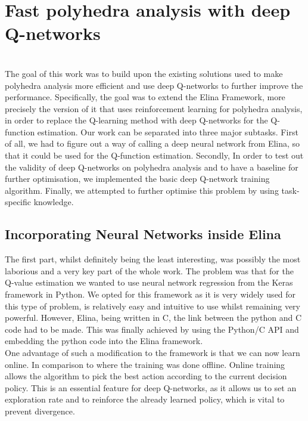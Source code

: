 
\chapter{Fast polyhedra analysis with deep Q-networks}
\mbox{}\\
The goal of this work was to build upon the existing solutions used to make polyhedra analysis more efficient and use deep Q-networks to further improve the performance. Specifically, the goal was to extend the Elina Framework, more precisely the version of it that uses reinforcement learning for polyhedra analysis, in order to replace the Q-learning method with deep Q-networks for the Q-function estimation. Our work can be separated into three major subtasks. First of all, we had to figure out a way of calling a deep neural network from Elina, so that it could be used for the Q-function estimation. Secondly, In order to test out the validity of deep Q-networks on polyhedra analysis and to have a baseline for further optimisation, we implemented the basic deep Q-network training algorithm. Finally, we attempted to further optimise this problem by using task-specific knowledge.

\section{Incorporating Neural Networks inside Elina}
The first part, whilst definitely being the least interesting, was possibly the most laborious and a very key part of the whole work. The problem was that for the Q-value estimation we wanted to use neural network regression from the Keras framework in Python. We opted for this framework as it is very widely used for this type of problem, is relatively easy and intuitive to use whilst remaining very powerful. However, Elina, being written in C, the link between the python and C code had to be made. This was finally achieved by using the Python/C API and embedding the python code into the Elina framework.\\
One advantage of such a modification to the framework is that we can now learn online. In comparison to \cite{singh2018fast} where the training was done offline. Online training allows the algorithm to pick the best action according to the current decision policy. This is an essential feature for deep Q-networks, as it allows us to set an exploration rate and to reinforce the already learned policy, which is vital to prevent divergence.
